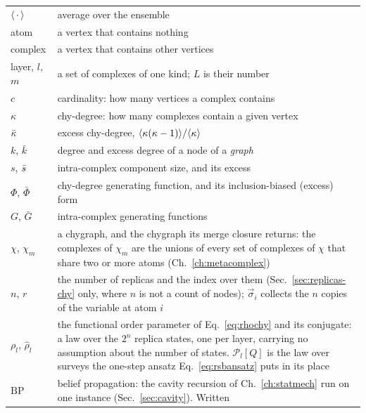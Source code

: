 \setlength\LTleft{0pt}\setlength\LTright{\fill}
\begin{longtable}{@{}L{1.28in}@{\hspace{0.8em}}L{2.48in}@{}}
$\langle \,\cdot\, \rangle$ & average over the ensemble\\[2pt]
atom & a vertex that contains nothing\\[2pt]
complex & a vertex that contains other vertices\\[2pt]
layer, $l$, $m$ & a set of complexes of one kind; $L$ is their number\\[2pt]
$c$ & cardinality: how many vertices a complex contains\\[2pt]
$\kappa$ & chy-degree: how many complexes contain a given vertex\\[2pt]
$\bar\kappa$ & excess chy-degree, $\langle \kappa(\kappa-1) \rangle/\langle \kappa \rangle$\\[2pt]
$k$, $\bar k$ & degree and excess degree of a node of a \emph{graph}\\[2pt]
$s$, $\bar s$ & intra-complex component size, and its excess\\[2pt]
$\Phi$, $\bar\Phi$ & chy-degree generating function, and its inclusion-biased
                     (excess) form\\[2pt]
$G$, $\bar G$ & intra-complex generating functions\\[2pt]
$\chi$, $\chi_{m}$ & a chygraph, and the chygraph its merge closure returns:
                    the complexes of $\chi_{m}$ are the unions of every set of
                    complexes of $\chi$ that share two or more atoms
                    (Ch.~\ref{ch:metacomplex})\\[2pt]
$n$, $r$ & the number of replicas and the index over them
                    (Sec.~\ref{sec:replicas-chy} only, where $n$ is not a count
                    of nodes); $\vec\sigma_{i}$ collects the $n$ copies of the
                    variable at atom $i$\\[2pt]
$\rho_{l}$, $\hat\rho_{l}$ & the functional order parameter of
                    Eq.~\eqref{eq:rhochy} and its conjugate: a law over the
                    $2^{n}$ replica states, one per layer, carrying no
                    assumption about the number of states.
                    $\mathcal{P}_{l}[Q]$ is the law over surveys the one-step
                    ansatz Eq.~\eqref{eq:rsbansatz} puts in its place\\[2pt]
$\mathrm{BP}$ & belief propagation: the cavity recursion of
                    Ch.~\ref{ch:statmech} run on one instance
                    (Sec.~\ref{sec:cavity}). Written

\end{longtable}
